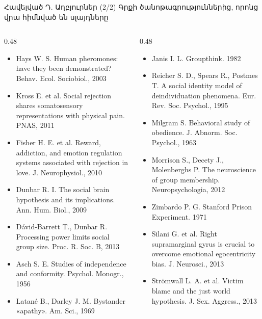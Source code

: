 \begin{frame}{Հավելված Դ. Աղբյուրներ (2/2)}
  \scriptsize
  Գրքի ծանոթագրություններից, որոնց վրա հիմնված են սլայդները\par\smallskip
  \begin{columns}[T]
    \begin{column}{0.48\textwidth}
      \begin{itemize}\setlength{\itemsep}{0.4mm}
        \item Hays W. S. Human pheromones: have they been demonstrated? Behav. Ecol. Sociobiol., 2003
        \item Kross E. et al. Social rejection shares somatosensory representations with physical pain. PNAS, 2011
        \item Fisher H. E. et al. Reward, addiction, and emotion regulation systems associated with rejection in love. J. Neurophysiol., 2010
        \item Dunbar R. I. The social brain hypothesis and its implications. Ann. Hum. Biol., 2009
        \item Dávid-Barrett T., Dunbar R. Processing power limits social group size. Proc. R. Soc. B, 2013
        \item Asch S. E. Studies of independence and conformity. Psychol. Monogr., 1956
        \item Latané B., Darley J. M. Bystander «apathy». Am. Sci., 1969
      \end{itemize}
    \end{column}
    \begin{column}{0.48\textwidth}
      \begin{itemize}\setlength{\itemsep}{0.4mm}
        \item Janis I. L. Groupthink. 1982
        \item Reicher S. D., Spears R., Postmes T. A social identity model of deindividuation phenomena. Eur. Rev. Soc. Psychol., 1995
        \item Milgram S. Behavioral study of obedience. J. Abnorm. Soc. Psychol., 1963
        \item Morrison S., Decety J., Molenberghs P. The neuroscience of group membership. Neuropsychologia, 2012
        \item Zimbardo P. G. Stanford Prison Experiment. 1971
        \item Silani G. et al. Right supramarginal gyrus is crucial to overcome emotional egocentricity bias. J. Neurosci., 2013
        \item Strömwall L. A. et al. Victim blame and the just world hypothesis. J. Sex. Aggress., 2013
      \end{itemize}
    \end{column}
  \end{columns}
\end{frame}

